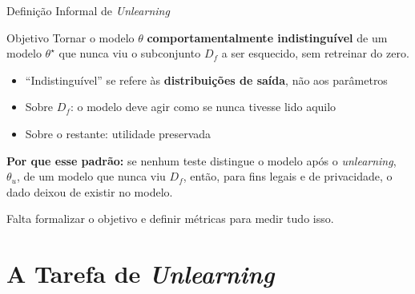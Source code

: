 \documentclass[aspectratio=169,xcolor=dvipsnames]{beamer}
\begin{document}
  \begin{frame}{Definição Informal de \textit{Unlearning}}
    \begin{block}{Objetivo}
      Tornar o modelo $\theta$ \textbf{comportamentalmente indistinguível} de um modelo $\theta^\star$ que nunca viu o subconjunto $D_f$ a ser esquecido, sem retreinar do zero.
    \end{block}

    \vspace{0.4em}
    \begin{itemize}\setlength{\itemsep}{0.2em}
      \item ``Indistinguível'' se refere às \textbf{distribuições de saída}, não aos parâmetros
      \item Sobre $D_f$: o modelo deve agir como se nunca tivesse lido aquilo
      \item Sobre o restante: utilidade preservada
    \end{itemize}

    \vspace{0.3em}
    {\footnotesize \textbf{Por que esse padrão:} se nenhum teste distingue o modelo após o \textit{unlearning}, $\theta_u$, de um modelo que nunca viu $D_f$, então, para fins legais e de privacidade, o dado deixou de existir no modelo.}

    \vspace{0.4em}
    \centering
    Falta formalizar o objetivo e definir métricas para medir tudo isso.
  \end{frame}

  \section{A Tarefa de \textit{Unlearning}}
\end{document}
